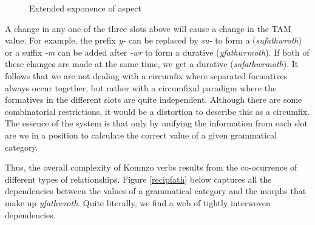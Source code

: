 \begin{figure}
\begin{center}%
\end{center}
\caption{Extended exponence of aspect}
\label{extendfath}
\end{figure}%

A change in any one of the three slots above will cause a change in the TAM value. For example, the prefix \emph{y-} can be replaced by \emph{su-} to form a   (\emph{sufathwroth}) or a suffix \emph{-m} can be added after \emph{-wr} to form a  durative (\emph{yfathwrmoth}). If both of these changes are made at the same time, we get a  durative (\emph{sufathwrmoth}). It follows that we are not dealing with a circumfix where separated formatives always occur together, but rather with a circumfixal paradigm where the formatives in the different slots are quite independent. Although there are some combinatorial restrictions, it would be a distortion to describe this as a circumfix. The essence of the system is that only by unifying the information from each slot are we in a position to calculate the correct value of a given grammatical category.%

Thus, the overall complexity of Komnzo verbs results from the co-ocurrence of different types of  relationships. Figure \ref{recipfath} below captures all the dependencies between the values of a grammatical category and the morphs that make up \emph{yfathwroth}. Quite literally, we find a web of tightly interwoven dependencies.

